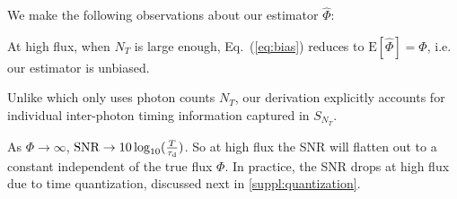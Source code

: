 We make the following observations about our estimator $\widehat\Phi$:
\begin{myitemize}
  \item At high flux, when $N_T$ is large enough, Eq.~(\ref{eq:bias}) reduces to
    $\text{E}[\widehat\Phi] = \Phi$, i.e.  our estimator is unbiased.
  \item Unlike \cite{ingle2019high} which only uses photon counts $N_T$, our
    derivation explicitly accounts for individual inter-photon timing
    information captured in $S_{N_T}$.
  \item As $\Phi\rightarrow\infty$,
    $\text{SNR}\rightarrow10\log_{10}(\frac{T}{\tau_\text{d}})$. So at high flux the
    SNR will flatten out to a constant independent of the true flux $\Phi$.  In
    practice, the SNR drops at high flux due to time quantization, discussed
    next in \ref{suppl:quantization}.
\end{myitemize}

